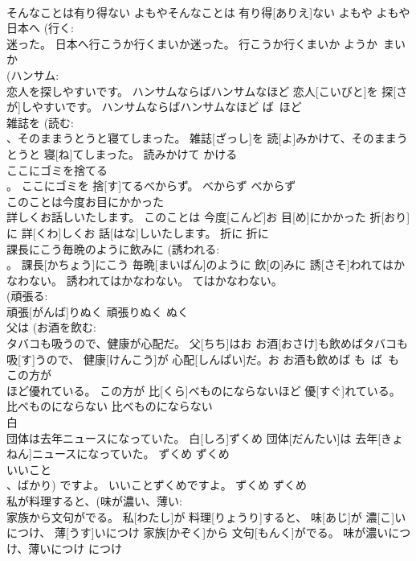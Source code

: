 \documentclass[8pt]{extreport}
\begin{document}
\begin{CJK}{UTF8}{min}
\\	そんなことは有り得ない	よもやそんなことは 有り得[ありえ]ない	よもや	よもや	
\\	日本へ (行く: 
\\	迷った。	日本へ行こうか行くまいか迷った。	行こうか行くまいか	ようか~まいか	
\\	(ハンサム: 
\\	恋人を探しやすいです。	ハンサムならばハンサムなほど 恋人[こいびと]を 探[さが]しやすいです。	ハンサムならばハンサムなほど	ば~ほど	
\\	雑誌を (読む: 
\\	、そのままうとうと寝てしまった。	雑誌[ざっし]を 読[よ]みかけて、そのままうとうと 寝[ね]てしまった。	読みかけて	かける	
\\	ここにゴミを捨てる 
\\	。	ここにゴミを 捨[す]てるべからず。	べからず	べからず	
\\	このことは今度お目にかかった 
\\	詳しくお話しいたします。	このことは 今度[こんど]お 目[め]にかかった 折[おり]に 詳[くわ]しくお 話[はな]しいたします。	折に	折に	
\\	課長にこう毎晩のように飲みに (誘われる: 
\\	。	課長[かちょう]にこう 毎晩[まいばん]のように 飲[の]みに 誘[さそ]われてはかなわない。	誘われてはかなわない。	てはかなわない。	
\\	(頑張る: 
\\	頑張[がんば]りぬく	頑張りぬく	ぬく	
\\	父は (お酒を飲む: 
\\	タバコも吸うので、健康が心配だ。	父[ちち]はお お酒[おさけ]も飲めばタバコも 吸[す]うので、 健康[けんこう]が 心配[しんぱい]だ。お	お酒も飲めば	も~ば~も	
\\	この方が 
\\	ほど優れている。	この方が 比[くら]べものにならないほど 優[すぐ]れている。	比べものにならない	比べものにならない	
\\	白 
\\	団体は去年ニュースになっていた。	白[しろ]ずくめ 団体[だんたい]は 去年[きょねん]ニュースになっていた。	ずくめ	ずくめ	
\\	いいこと 
\\	、ばかり) ですよ。	いいことずくめですよ。	ずくめ	ずくめ	
\\	私が料理すると、(味が濃い、薄い: 
\\	家族から文句がでる。	私[わたし]が 料理[りょうり]すると、 味[あじ]が 濃[こ]いにつけ、 薄[うす]いにつけ 家族[かぞく]から 文句[もんく]がでる。	味が濃いにつけ、薄いにつけ	につけ	

\end{CJK}
\end{document}

